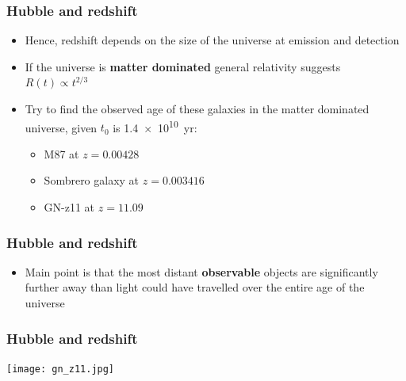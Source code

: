 \documentclass{beamer}
\begin{document}
\begin{frame}
  \frametitle{Hubble and redshift}
  \begin{itemize}
    \item Hence, redshift depends on the size of the universe at emission and detection
    \item If the universe is \textbf{matter dominated} general relativity suggests $R(t)\propto t^{2/3}$
    \item Try to find the observed age of these galaxies in the matter dominated universe, given $t_0$ is \SI{1.4e10}{yr}:
      \begin{itemize}
	\item M87 at $z=0.00428$
	\item Sombrero galaxy at $z=0.003416$
	\item GN-z11 at $z=11.09$
      \end{itemize}
  \end{itemize}
\end{frame}

\begin{frame}
  \frametitle{Hubble and redshift}
  \begin{itemize}
    \item Main point is that the most distant \textbf{observable} objects are significantly further away than light could have travelled over the entire age of the universe
  \end{itemize}
\end{frame}

\begin{frame}
  \frametitle{Hubble and redshift}
  \center
  \texttt{[image: gn\_z11.jpg]}
\end{frame}
\end{document}
